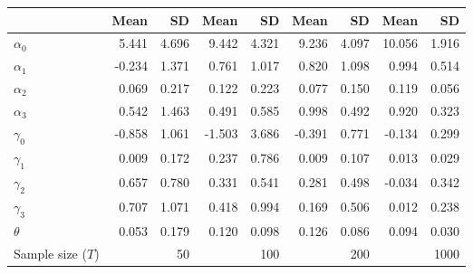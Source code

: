 
\begin{tabular}[t]{lrrrrrrrr}
\toprule
  & Mean & SD & Mean  & SD  & Mean   & SD   & Mean    & SD   \\
\midrule
$\alpha_{0}$ & 5.441 & 4.696 & 9.442 & 4.321 & 9.236 & 4.097 & 10.056 & 1.916\\
$\alpha_{1}$ & -0.234 & 1.371 & 0.761 & 1.017 & 0.820 & 1.098 & 0.994 & 0.514\\
$\alpha_{2}$ & 0.069 & 0.217 & 0.122 & 0.223 & 0.077 & 0.150 & 0.119 & 0.056\\
$\alpha_{3}$ & 0.542 & 1.463 & 0.491 & 0.585 & 0.998 & 0.492 & 0.920 & 0.323\\
$\gamma_{0}$ & -0.858 & 1.061 & -1.503 & 3.686 & -0.391 & 0.771 & -0.134 & 0.299\\
$\gamma_{1}$ & 0.009 & 0.172 & 0.237 & 0.786 & 0.009 & 0.107 & 0.013 & 0.029\\
$\gamma_{2}$ & 0.657 & 0.780 & 0.331 & 0.541 & 0.281 & 0.498 & -0.034 & 0.342\\
$\gamma_{3}$ & 0.707 & 1.071 & 0.418 & 0.994 & 0.169 & 0.506 & 0.012 & 0.238\\
$\theta$ & 0.053 & 0.179 & 0.120 & 0.098 & 0.126 & 0.086 & 0.094 & 0.030\\
Sample size ($T$) &  & 50 &  & 100 &  & 200 &  & 1000\\
\bottomrule
\end{tabular}
